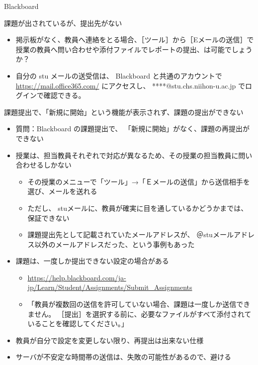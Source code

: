 \documentclass[a4j,10pt]{jsarticle}
\begin{document}
{\begin{frame}[label={sec:orgc119bb0},fragile]{Blackboard}
\begin{block}{課題が出されているが、提出先がない}
\begin{itemize}
\begin{itemize}
\item 掲示板がなく、教員へ連絡をとる場合、［ツール］から［Eメールの送信］で授業の教員へ問い合わせや添付ファイルでレポートの提出、は可能でしょうか？
\item 自分の stu メールの送受信は、 Blackboard と共通のアカウントで
\url{https://mail.office365.com/}
にアクセスし、 ****@stu.chs.niihon-u.ac.jp でログインで確認できる。
\end{itemize}
\end{itemize}
\end{block}
\par
\begin{block}{課題提出で、「新規に開始」という機能が表示されず、課題の提出ができない}
\begin{itemize}
\item 質問：Blackboard の課題提出で、 「新規に開始」がなく、課題の再提出ができない
\par
\item 授業は、担当教員それぞれで対応が異なるため、その授業の担当教員に問い合わせるしかない
\begin{itemize}
\item その授業のメニューで「ツール」→「Ｅメールの送信」から送信相手を選び、メールを送れる
\item ただし、 stuメールに、教員が確実に目を通しているかどうかまでは、保証できない
\item 課題提出先として記載されていたメールアドレスが、 ＠stuメールアドレス以外のメールアドレスだった、という事例もあった
\end{itemize}
\end{itemize}
\par
\begin{itemize}
\item 課題は、一度しか提出できない設定の場合がある
\begin{itemize}
\item \url{https://help.blackboard.com/ja-jp/Learn/Student/Assignments/Submit\_Assignments}
\item 「教員が複数回の送信を許可していない場合、課題は一度しか送信できません。 ［提出］を選択する前に、必要なファイルがすべて添付されていることを確認してください。」
\end{itemize}
\par
\item 教員が自分で設定を変更しない限り、再提出は出来ない仕様
\item サーバが不安定な時間帯の送信は、失敗の可能性があるので、避ける
\end{itemize}

\end{block}
\end{frame}}
\end{document}
